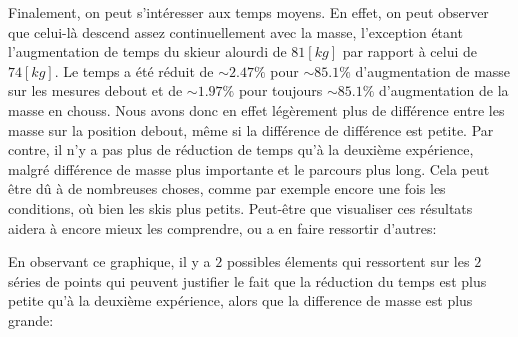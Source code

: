 \documentclass{article}
\begin{document}
\vspace{0.3cm}

Finalement, on peut s'intéresser aux temps moyens. En effet, on peut observer que celui-là descend assez continuellement avec la masse, l'exception étant l'augmentation de temps du skieur alourdi de $81[kg]$ par rapport à celui de $74[kg]$. Le temps a été réduit de $\sim 2.47\%$ pour $\sim 85.1\%$ d'augmentation de masse sur les mesures debout et de $\sim 1.97\%$ pour toujours $\sim 85.1\%$ d'augmentation de la masse en chouss. Nous avons donc en effet légèrement plus de différence entre les masse sur la position debout, même si la différence de différence est petite. Par contre, il n'y a pas plus de réduction de temps qu'à la deuxième expérience, malgré différence de masse plus importante et le parcours plus long. Cela peut être dû à de nombreuses choses, comme par exemple encore une fois les conditions, où bien les skis plus petits. Peut-être que visualiser ces résultats aidera à encore mieux les comprendre, ou a en faire ressortir d'autres:

\begin{center}
\end{center}

En observant ce graphique, il y a $2$ possibles élements qui ressortent sur les $2$ séries de points qui peuvent justifier le fait que la réduction du temps est plus petite qu'à la deuxième expérience, alors que la difference de masse est plus grande:
\end{document}
